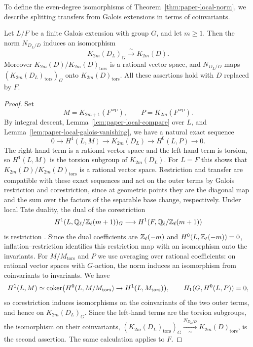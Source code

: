 To define the even-degree isomorphisms of Theorem~\ref{thm:paper-local-norm}, we describe splitting transfers from Galois extensions in terms of coinvariants.

\begin{lemma}\label{lem:paper-local-even-coinvariants}
Let $L/F$ be a finite Galois extension with group $G$, and let $m\ge1$.
Then the norm $N_{D_L/D}$ induces an isomorphism
\[
 K_{2m}(D_L)_G\xrightarrow{\ \sim\ }K_{2m}(D).
\]
Moreover $K_{2m}(D)/K_{2m}(D)_{\mathrm{tors}}$ is a rational vector space, and $N_{D_L/D}$ maps $(K_{2m}(D_L)_{\mathrm{tors}})_G$ onto $K_{2m}(D)_{\mathrm{tors}}$.
All these assertions hold with $D$ replaced by $F$.
\end{lemma}
\begin{proof}
Set
\[
 M=K_{2m+1}(F^{\mathrm{sep}}),\qquad P=K_{2m}(F^{\mathrm{sep}}).
\]
By integral descent, Lemma~\ref{lem:paper-local-compare} over $L$, and Lemma~\ref{lem:paper-local-galois-vanishing}, we have a natural exact sequence
\[
 0\longrightarrow H^1(L,M)\longrightarrow K_{2m}(D_L)
 \longrightarrow H^0(L,P)\longrightarrow0.
\]
The right-hand term is a rational vector space and the left-hand term is torsion, so $H^1(L,M)$ is the torsion subgroup of $K_{2m}(D_L)$.
For $L=F$ this shows that $K_{2m}(D)/K_{2m}(D)_{\mathrm{tors}}$ is a rational vector space.
Restriction and transfer are compatible with these exact sequences and act on the outer terms by Galois restriction and corestriction, since at geometric points they are the diagonal map and the sum over the factors of the separable base change, respectively.
Under local Tate duality, the dual of the corestriction
\[
 H^1(L,\mathbb Q_\ell/\mathbb Z_\ell(m+1))_G\longrightarrow H^1(F,\mathbb Q_\ell/\mathbb Z_\ell(m+1))
\]
is restriction \cite{TateDuality}.
Since the dual coefficients are $\mathbb Z_\ell(-m)$ and $H^0(L,\mathbb Z_\ell(-m))=0$, inflation--restriction identifies this restriction map with an isomorphism onto the invariants.
For $M/M_{\mathrm{tors}}$ and $P$ we use averaging over rational coefficients: on rational vector spaces with $G$-action, the norm induces an isomorphism from coinvariants to invariants.
We have
\[
 H^1(L,M)\simeq\operatorname{coker}\bigl(H^0(L,M/M_{\mathrm{tors}})\to H^1(L,M_{\mathrm{tors}})\bigr),\qquad H_1(G,H^0(L,P))=0,
\]
so corestriction induces isomorphisms on the coinvariants of the two outer terms, and hence on $K_{2m}(D_L)_G$.
Since the left-hand terms are the torsion subgroups, the isomorphism on their coinvariants, $(K_{2m}(D_L)_{\mathrm{tors}})_G\xrightarrow[\ \sim\ ]{N_{D_L/D}}K_{2m}(D)_{\mathrm{tors}}$, is the second assertion.
The same calculation applies to $F$.
\end{proof}

